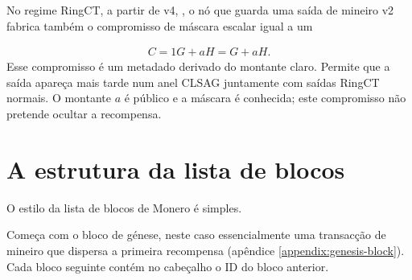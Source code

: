 
%
No regime RingCT, a partir de v4,
\cite{ringct-dates}, o nó que guarda uma saída de mineiro v2 fabrica também o
compromisso de máscara escalar igual a um

\begin{align*}
C=1G+aH=G+aH.
\end{align*}
Esse compromisso é um metadado derivado do montante claro. Permite que a
saída apareça mais tarde
num anel CLSAG juntamente com saídas RingCT normais. O montante $a$ é público
e a máscara é conhecida; este compromisso não pretende ocultar a recompensa.





\section{A estrutura da lista de blocos}

\label{sec:blockchain-structure}

O estilo da lista de blocos de Monero é simples.

%
Começa com o bloco de génese, neste caso essencialmente uma transacção de
mineiro que dispersa a primeira recompensa (apêndice
\ref{appendix:genesis-block}). Cada bloco seguinte contém no cabeçalho o ID do
bloco anterior.

